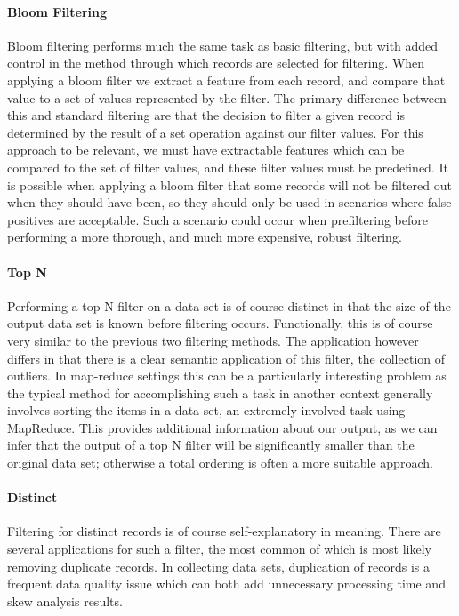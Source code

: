 \paragraph{Bloom Filtering}
Bloom filtering performs much the same task as basic filtering, but with added control in the method through which records are selected for filtering. When applying a bloom filter we extract a feature from each record, and compare that value to a set of values represented by the filter. The primary difference between this and standard filtering are that the decision to filter a given record is determined by the result of a set operation against our filter values. For this approach to be relevant, we must have extractable features which can be compared to the set of filter values, and these filter values must be predefined. It is possible when applying a bloom filter that some records will not be filtered out when they should have been, so they should only be used in scenarios where false positives are acceptable. Such a scenario could occur when prefiltering before performing a more thorough, and much more expensive, robust filtering.

\paragraph{Top N}
Performing a top N filter on a data set is of course distinct in that the size of the output data set is known before filtering occurs. Functionally, this is of course very similar to the previous two filtering methods. The application however differs in that there is a clear semantic application of this filter, the collection of outliers. In map-reduce settings this can be a particularly interesting problem as the typical method for accomplishing such a task in another context generally involves sorting the items in a data set, an extremely involved task using MapReduce. This provides additional information about our output, as we can infer that the output of a top N filter will be significantly smaller than the original data set; otherwise a total ordering is often a more suitable approach.

\paragraph{Distinct}
Filtering for distinct records is of course self-explanatory in meaning. There are several applications for such a filter, the most common of which is most likely removing duplicate records. In collecting data sets, duplication of records is a frequent data quality issue which can both add unnecessary processing time and skew analysis results. 



